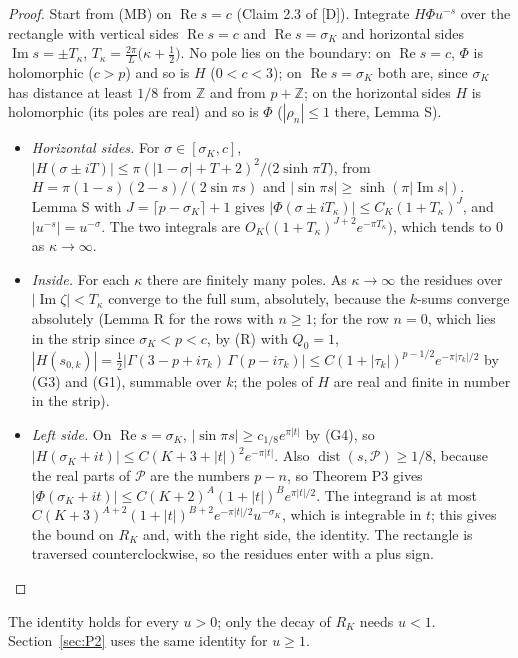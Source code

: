 \documentclass[11pt]{article}
\newcommand{\re}{\operatorname{Re}}
\newcommand{\im}{\operatorname{Im}}
\newcommand{\dist}{\operatorname{dist}}
\begin{document}
\begin{proof}
Start from (MB) on $\re s=c$ (Claim 2.3 of [D]). Integrate $H\Phi u^{-s}$ over the rectangle with vertical sides $\re s=c$ and $\re s=\sigma_K$ and horizontal sides $\im s=\pm T_\kappa$, $T_\kappa=\frac{2\pi}{L}\bigl(\kappa+\frac12\bigr)$. No pole lies on the boundary: on $\re s=c$, $\Phi$ is holomorphic ($c>p$) and so is $H$ ($0<c<3$); on $\re s=\sigma_K$ both are, since $\sigma_K$ has distance at least $1/8$ from $\mathbb{Z}$ and from $p+\mathbb{Z}$; on the horizontal sides $H$ is holomorphic (its poles are real) and so is $\Phi$ ($|\rho_n|\le1$ there, Lemma S).
\begin{itemize}
\item \emph{Horizontal sides.} For $\sigma\in[\sigma_K,c]$, $|H(\sigma\pm iT)|\le\pi(|1-\sigma|+T+2)^2/\bigl(2\sinh\pi T\bigr)$, from $H=\pi(1-s)(2-s)/(2\sin\pi s)$ and $|\sin\pi s|\ge\sinh(\pi|\im s|)$. Lemma S with $J=\lceil p-\sigma_K\rceil+1$ gives $|\Phi(\sigma\pm iT_\kappa)|\le C_K(1+T_\kappa)^J$, and $|u^{-s}|=u^{-\sigma}$. The two integrals are $O_K\bigl((1+T_\kappa)^{J+2}e^{-\pi T_\kappa}\bigr)$, which tends to $0$ as $\kappa\to\infty$.
\item \emph{Inside.} For each $\kappa$ there are finitely many poles. As $\kappa\to\infty$ the residues over $|\im\zeta|<T_\kappa$ converge to the full sum, absolutely, because the $k$-sums converge absolutely (Lemma R for the rows with $n\ge1$; for the row $n=0$, which lies in the strip since $\sigma_K<p<c$, by (R) with $Q_0=1$, $|H(s_{0,k})|=\frac12|\Gamma(3-p+i\tau_k)\,\Gamma(p-i\tau_k)|\le C(1+|\tau_k|)^{p-1/2}e^{-\pi|\tau_k|/2}$ by (G3) and (G1), summable over $k$; the poles of $H$ are real and finite in number in the strip).
\item \emph{Left side.} On $\re s=\sigma_K$, $|\sin\pi s|\ge c_{1/8}e^{\pi|t|}$ by (G4), so $|H(\sigma_K+it)|\le C(K+3+|t|)^2e^{-\pi|t|}$. Also $\dist(s,\mathcal{P})\ge1/8$, because the real parts of $\mathcal{P}$ are the numbers $p-n$, so Theorem P3 gives $|\Phi(\sigma_K+it)|\le C(K+2)^A(1+|t|)^Be^{\pi|t|/2}$. The integrand is at most $C(K+3)^{A+2}(1+|t|)^{B+2}e^{-\pi|t|/2}u^{-\sigma_K}$, which is integrable in $t$; this gives the bound on $R_K$ and, with the right side, the identity. The rectangle is traversed counterclockwise, so the residues enter with a plus sign.
\end{itemize}
\end{proof}

The identity holds for every $u>0$; only the decay of $R_K$ needs $u<1$. Section~\ref{sec:P2} uses the same identity for $u\ge1$.
\end{document}
